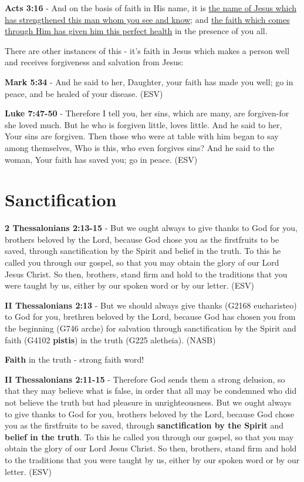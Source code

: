 \documentclass[11pt]{article}
\begin{document}
\textbf{Acts 3:16} - And on the basis of faith in His name, it is \uline{the name of Jesus which has strengthened this man whom you see and know}; and \uline{the faith which comes through Him has given him this perfect health} in the presence of you all.

There are other instances of this - it's faith in Jesus which makes a person well and receives forgiveness and salvation from Jesus:

\textbf{Mark 5:34} -  And he said to her, Daughter, your faith has made you well; go in peace, and be healed of your disease.  (ESV)

\textbf{Luke 7:47-50} - Therefore I tell you, her sins, which are many, are forgiven-for she loved much. But he who is forgiven little, loves little. And he said to her, Your sins are forgiven. Then those who were at table with him began to say among themselves, Who is this, who even forgives sins? And he said to the woman, Your faith has saved you; go in peace. (ESV)

\section{Sanctification}
\label{sec:org2180bdc}
\textbf{2 Thessalonians 2:13-15} -  But we ought always to give thanks to God for you, brothers beloved by the Lord, because God chose you as the firstfruits to be saved, through sanctification by the Spirit and belief in the truth.  To this he called you through our gospel, so that you may obtain the glory of our Lord Jesus Christ.  So then, brothers, stand firm and hold to the traditions that you were taught by us, either by our spoken word or by our letter.  (ESV)

\textbf{II Thessalonians 2:13} - But we should always give thanks (G2168 eucharisteo) to God for you, brethren beloved by the Lord, because God has chosen you from the beginning (G746 arche) for salvation through sanctification by the Spirit and faith (G4102 \textbf{pistis}) in the truth (G225 aletheia). (NASB)

\textbf{Faith} in the truth - strong faith word!

\textbf{II Thessalonians 2:11-15} - Therefore God sends them a strong delusion, so that they may believe what is false, in order that all may be condemned who did not believe the truth but had pleasure in unrighteousness. But we ought always to give thanks to God for you, brothers beloved by the Lord, because God chose you as the firstfruits to be saved, through \textbf{sanctification by the Spirit} and \textbf{belief in the truth}. To this he called you through our gospel, so that you may obtain the glory of our Lord Jesus Christ. So then, brothers, stand firm and hold to the traditions that you were taught by us, either by our spoken word or by our letter.  (ESV)
\end{document}
